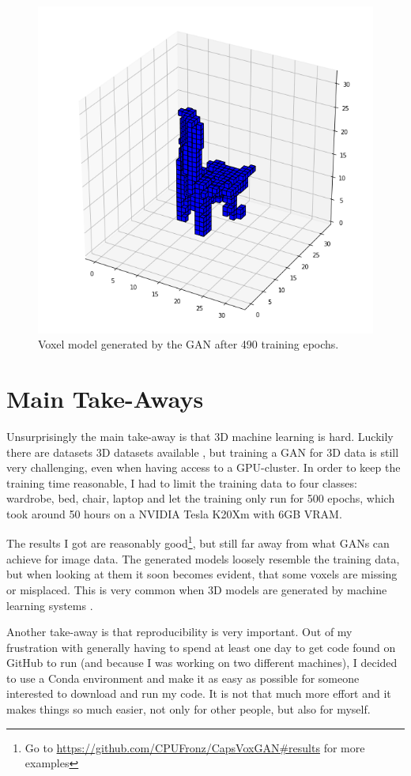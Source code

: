 \documentclass[11pt]{article}
\begin{document}
\begin{figure}
	\centering
	\includegraphics[width=0.7\linewidth]{../plots/epoch0490}
	\caption{Voxel model generated by the GAN after 490 training epochs.}
	\label{fig:voxel_example}
\end{figure}


\section{Main Take-Aways}
\label{sec:take-away}
Unsurprisingly the main take-away is that 3D machine learning is hard. Luckily there are datasets 3D datasets available \cite{wu2015}, but training a GAN for 3D data is still very challenging, even when having access to a GPU-cluster. In order to keep the training time reasonable, I had to limit the training data to four classes: wardrobe, bed, chair, laptop and let the training only run for 500 epochs, which took around 50 hours on a NVIDIA Tesla K20Xm with 6GB VRAM.

The results I got are reasonably good\footnote{Go to \url{https://github.com/CPUFronz/CapsVoxGAN\#results} for more examples}, but still far away from what GANs can achieve for image data. The generated models loosely resemble the training data, but when looking at them it soon becomes evident, that some voxels are missing or misplaced. This is very common when 3D models are generated by machine learning systems \cite{zhao2019b, wu2016}.

Another take-away is that reproducibility is very important. Out of my frustration with generally having to spend at least one day to get code found on GitHub to run (and because I was working on two different machines), I decided to use a Conda environment and make it as easy as possible for someone interested to download and run my code. It is not that much more effort and it makes things so much easier, not only for other people, but also for myself.
\end{document}
